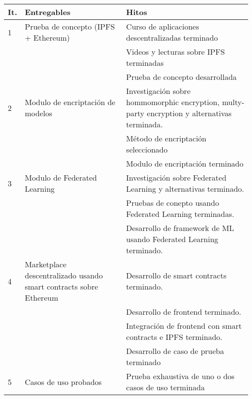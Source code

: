 \documentclass[
11pt, %
spanish, %
singlespacing, %
headsepline, %
]{MastersDoctoralThesis} %
\begin{document}
{
\setlength{\extrarowheight}{.2em}
\begin{center}
	\begin{tabularx}{\textwidth}{|l|X|X|}
    \hline
    \textbf{It.} & \textbf{Entregables} & \textbf{Hitos}  \\ \hline
    1 & Prueba de concepto (IPFS + Ethereum) & Curso de aplicaciones descentralizadas terminado  \\ 
      & & Videos y lecturas sobre IPFS terminadas \\
      & & Prueba de concepto desarrollada  \\ \hline
    2 & Modulo de encriptación de modelos & Investigación sobre hommomorphic encryption, multy-party encryption y alternativas terminada. \\ 
      & & Método de encriptación seleccionado \\
      & & Modulo de encriptación terminado \\ \hline
    3 & Modulo de Federated Learning & Investigación sobre Federated Learning y alternativas terminado. \\ 
      & & Pruebas de conepto usando Federated Learning terminadas. \\
      & & Desarrollo de framework de ML usando Federated Learning terminado. \\ \hline
    4 & Marketplace descentralizado usando smart contracts sobre Ethereum & Desarrollo de smart contracts terminado. \\
      & & Desarrollo de frontend terminado. \\
      & & Integración de frontend con smart contracts e IPFS terminado. \\
      & & Desarrollo de caso de prueba terminado \\ \hline 
    5 & Casos de uso probados & Prueba exhaustiva de uno o dos casos de uso terminada \\ \hline
    \end{tabularx}
\end{center}
}



\printbibliography[heading=bibintoc]


\end{document}
